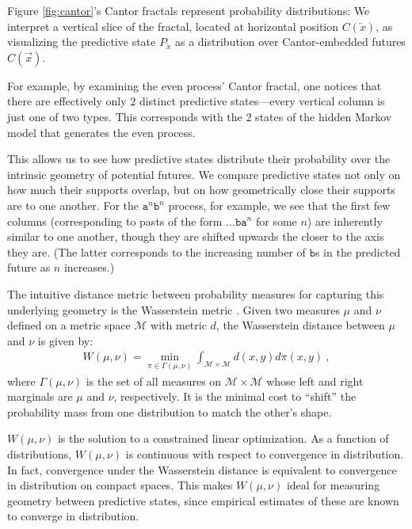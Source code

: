 \documentclass[draft,aps,pre,twocolumn,groupaddress,showkeys,nofootinbib,preprintnumbers,floatfix]{revtex4-2}
\begin{document}
Figure \ref{fig:cantor}'s Cantor fractals represent probability distributions:
We interpret a vertical slice of the fractal, located at horizontal position
$C(\overleftarrow{x})$, as visualizing the predictive state
$P_{\overleftarrow{x}}$ as a distribution over Cantor-embedded futures
$C(\overrightarrow{x})$.

For example, by examining the even process' Cantor fractal, one notices that
there are effectively only $2$ distinct predictive states---every vertical
column is just one of two types. This corresponds with the $2$ states of the
hidden Markov model that generates the even process.

This allows us to see how predictive states distribute their probability over
the intrinsic geometry of potential futures. We compare predictive states not
only on how much their supports overlap, but on how geometrically close their
supports are to one another. For the $\mathtt{a}^n \mathtt{b}^n$ process, for
example, we see that the first few columns (corresponding to pasts of the form
$\dots \mathtt{b a}^n$ for some $n$) are inherently similar to one another,
though they are shifted upwards the closer to the axis they are. (The latter
corresponds to the increasing number of $\mathtt{b}$s in the predicted future
as $n$ increases.)

The intuitive distance metric between probability measures for capturing this
underlying geometry is the Wasserstein metric \cite{Pane19a}. Given two measures
$\mu$ and $\nu$ defined on a metric space $\mathcal{M}$ with metric $d$, the
Wasserstein distance between $\mu$ and $\nu$ is given by:
\begin{align*}
  W(\mu,\nu) = \min_{\pi\in \Gamma(\mu,\nu)}
   \int_{\mathcal{M}\times\mathcal{M}} 
   d(x,y) d\pi(x,y)
   ~,
\end{align*}
where $\Gamma(\mu,\nu)$ is the set of all measures on $\mathcal{M} \times
\mathcal{M}$ whose left and right marginals are $\mu$ and $\nu$, respectively.
It is the minimal cost to ``shift'' the probability mass from one distribution
to match the other's shape. 

$W(\mu,\nu)$ is the solution to a constrained linear optimization. As a
function of distributions, $W(\mu,\nu)$ is continuous with respect to
convergence in distribution. In fact, convergence under the Wasserstein
distance is equivalent to convergence in distribution on compact spaces. This
makes $W(\mu,\nu)$ ideal for measuring geometry between predictive states,
since empirical estimates of these are known to converge in distribution.
\end{document}

